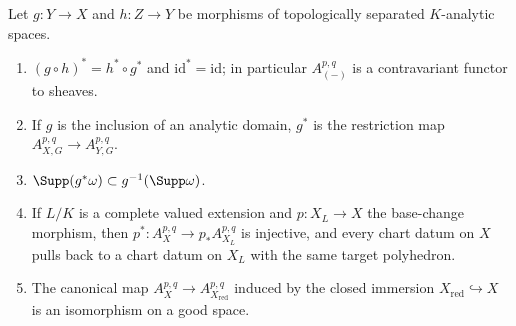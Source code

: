 \begin{proposition}
\label{prop:ch13-pullback-properties}
Let $g:Y\to X$ and $h:Z\to Y$ be morphisms of topologically separated
$K$-analytic spaces.
\begin{enumerate}
\item\label{itm:ch13-pb:funct} $(g\circ h)^*=h^*\circ g^*$ and
  $\mathrm{id}^*=\mathrm{id}$; in particular $A^{p,q}_{(-)}$ is a
  contravariant functor to sheaves.
\item\label{itm:ch13-pb:domain} If $g$ is the inclusion of an analytic
  domain, $g^*$ is the restriction map $A^{p,q}_{X,G}\to A^{p,q}_{Y,G}$.
\item\label{itm:ch13-pb:supp} $\Supp(g^*\omega)\subset g^{-1}(\Supp\omega)$.
\item\label{itm:ch13-pb:base} If $L/K$ is a complete valued extension and
  $p:X_L\to X$ the base-change morphism, then
  $p^*:A^{p,q}_X\to p_*A^{p,q}_{X_L}$ is injective, and every chart datum on
  $X$ pulls back to a chart datum on $X_L$ with the same target polyhedron.
\item\label{itm:ch13-pb:red} The canonical map
  $A^{p,q}_X\to A^{p,q}_{X_{\mathrm{red}}}$ induced by the closed immersion
  $X_{\mathrm{red}}\hookrightarrow X$ is an isomorphism on a good space.
\end{enumerate}
\end{proposition}

